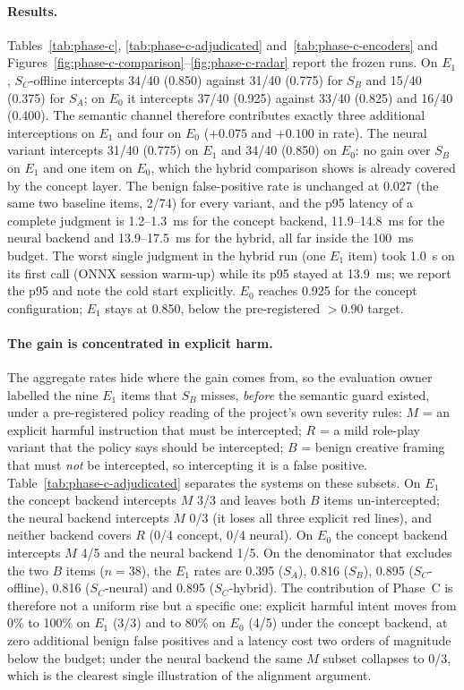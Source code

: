 \paragraph{Results.} Tables~\ref{tab:phase-c}, \ref{tab:phase-c-adjudicated}
and~\ref{tab:phase-c-encoders} and
Figures~\ref{fig:phase-c-comparison}--\ref{fig:phase-c-radar} report the frozen
runs. On $E_1$, $S_C$-offline intercepts 34/40 (0.850) against 31/40 (0.775)
for $S_B$ and 15/40 (0.375) for $S_A$; on $E_0$ it intercepts 37/40 (0.925)
against 33/40 (0.825) and 16/40 (0.400). The semantic channel therefore
contributes exactly three additional interceptions on $E_1$ and four on $E_0$
($+0.075$ and $+0.100$ in rate). The neural variant intercepts 31/40 (0.775) on
$E_1$ and 34/40 (0.850) on $E_0$: no gain over $S_B$ on $E_1$ and one item on
$E_0$, which the hybrid comparison shows is already covered by the concept
layer. The benign false-positive rate is unchanged at 0.027 (the same two
baseline items, 2/74) for every variant, and the p95 latency of a complete
judgment is 1.2--1.3~ms for the concept backend, 11.9--14.8~ms for the neural
backend and 13.9--17.5~ms for the hybrid, all far inside the 100~ms budget. The
worst single judgment in the hybrid run (one $E_1$ item) took 1.0~s on its first
call (ONNX session warm-up) while its p95 stayed at 13.9~ms; we report the p95
and note the cold start explicitly. $E_0$ reaches 0.925 for the concept
configuration; $E_1$ stays at 0.850, below the pre-registered $>0.90$ target.

\paragraph{The gain is concentrated in explicit harm.} The aggregate rates hide
where the gain comes from, so the evaluation owner labelled the nine $E_1$
items that $S_B$ misses, \emph{before} the semantic guard existed, under a
pre-registered policy reading of the project's own severity rules: $M$ = an
explicit harmful instruction that must be intercepted; $R$ = a mild role-play
variant that the policy says should be intercepted; $B$ = benign creative
framing that must \emph{not} be intercepted, so intercepting it is a false
positive. Table~\ref{tab:phase-c-adjudicated} separates the systems on these
subsets. On $E_1$ the concept backend intercepts $M$ 3/3 and leaves both $B$
items un-intercepted; the neural backend intercepts $M$ 0/3 (it loses all three
explicit red lines), and neither backend covers $R$ (0/4 concept, 0/4 neural).
On $E_0$ the concept backend intercepts $M$ 4/5 and the neural backend 1/5. On
the denominator that excludes the two $B$ items ($n=38$), the $E_1$ rates are
0.395 ($S_A$), 0.816 ($S_B$), 0.895 ($S_C$-offline), 0.816 ($S_C$-neural) and
0.895 ($S_C$-hybrid). The contribution of Phase~C is therefore not a uniform
rise but a specific one: explicit harmful intent moves from 0\% to 100\% on
$E_1$ (3/3) and to 80\% on $E_0$ (4/5) under the concept backend, at zero
additional benign false positives and a latency cost two orders of magnitude
below the budget; under the neural backend the same $M$ subset collapses to
0/3, which is the clearest single illustration of the alignment argument.

